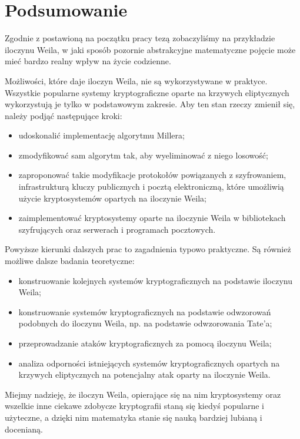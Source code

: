\chapter*{Podsumowanie}

\noindent
Zgodnie z postawioną na początku pracy tezą
zobaczyliśmy na przykładzie iloczynu Weila,
w jaki sposób pozornie abstrakcyjne matematyczne pojęcie
może mieć bardzo realny wpływ na życie codzienne.

\noindent
Możliwości, które daje iloczyn Weila,
nie są wykorzystywane w praktyce.
Wszystkie popularne systemy kryptograficzne
oparte na krzywych eliptycznych
wykorzystują je tylko w podstawowym zakresie.
Aby ten stan rzeczy zmienił się,
należy podjąć następujące kroki:
\begin{itemize}
\item
udoskonalić implementację algorytmu Millera;
\item
zmodyfikować sam algorytm tak, aby wyeliminować z niego losowość;
\item
zaproponować takie modyfikacje protokołów
powiązanych z szyfrowaniem,
infrastrukturą kluczy publicznych
i pocztą elektroniczną,
które umożliwią użycie kryptosystemów opartych na iloczynie Weila;
\item
zaimplementować kryptosystemy oparte na iloczynie Weila
w bibliotekach szyfrujących oraz serwerach i programach pocztowych.
\end{itemize}

\noindent
Powyższe kierunki dalszych prac to zagadnienia typowo praktyczne.
Są również możliwe dalsze badania teoretyczne:
\begin{itemize}
\item
konstruowanie kolejnych systemów kryptograficznych
na podstawie iloczynu Weila;
\item
konstruowanie systemów kryptograficznych
na podstawie odwzorowań podobnych do iloczynu Weila,
np. na podstawie odwzorowania Tate'a;
\item
przeprowadzanie ataków kryptograficznych za pomocą iloczynu Weila;
\item
analiza odporności istniejących systemów kryptograficznych
opartych na krzywych eliptycznych
na potencjalny atak oparty na iloczynie Weila.
\end{itemize}

\noindent
Miejmy nadzieję, że iloczyn Weila,
opierające się na nim kryptosystemy
oraz wszelkie inne ciekawe zdobycze kryptografii
staną się kiedyś popularne i użyteczne,
a dzięki nim matematyka stanie się nauką bardziej lubianą i docenianą.
